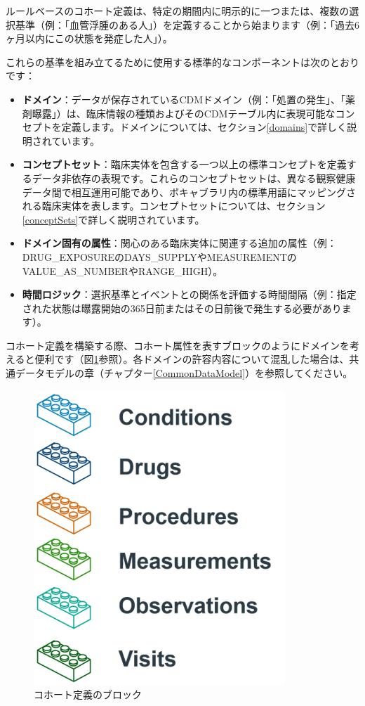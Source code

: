 \documentclass[
  11pt]{book}
\theoremstyle{definition}
\theoremstyle{definition}
\theoremstyle{definition}
\theoremstyle{definition}
\theoremstyle{remark}
\begin{document}
ルールベースのコホート定義は、特定の期間内に明示的に一つまたは、複数の選択基準（例：「血管浮腫のある人」）を定義することから始まります（例：「過去6ヶ月以内にこの状態を発症した人」）。

これらの基準を組み立てるために使用する標準的なコンポーネントは次のとおりです：

\begin{itemize}
\item
  \textbf{ドメイン}：データが保存されているCDMドメイン（例：「処置の発生」、「薬剤曝露」）は、臨床情報の種類およびそのCDMテーブル内に表現可能なコンセプトを定義します。ドメインについては、セクション\ref{domains}で詳しく説明されています。
\item
  \textbf{コンセプトセット}：臨床実体を包含する一つ以上の標準コンセプトを定義するデータ非依存の表現です。これらのコンセプトセットは、異なる観察健康データ間で相互運用可能であり、ボキャブラリ内の標準用語にマッピングされる臨床実体を表します。コンセプトセットについては、セクション\ref{conceptSets}で詳しく説明されています。
\item
  \textbf{ドメイン固有の属性}：関心のある臨床実体に関連する追加の属性（例：DRUG\_EXPOSUREのDAYS\_SUPPLYやMEASUREMENTのVALUE\_AS\_NUMBERやRANGE\_HIGH）。
\item
  \textbf{時間ロジック}：選択基準とイベントとの関係を評価する時間間隔（例：指定された状態は曝露開始の365日前またはその日前後で発生する必要があります）。
\end{itemize}

コホート定義を構築する際、コホート属性を表すブロックのようにドメインを考えると便利です（図\ref{fig:cohortLegos}参照）。各ドメインの許容内容について混乱した場合は、共通データモデルの章（チャプター\ref{CommonDataModel}）を参照してください。

\begin{figure}

{\centering \includegraphics[width=0.5\linewidth]{images/Cohorts/cohort-legos} 

}

\caption{コホート定義のブロック}\label{fig:cohortLegos}
\end{figure}
\end{document}
